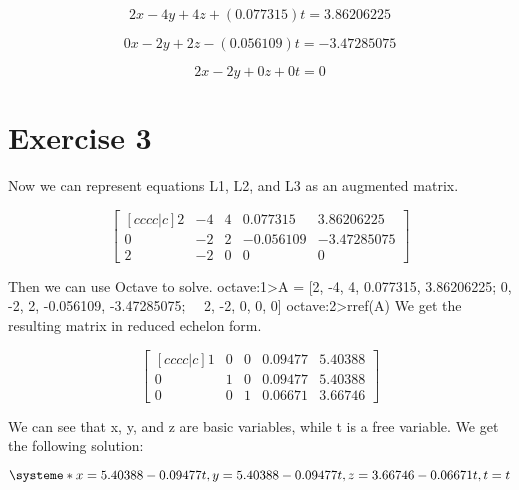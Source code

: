 \documentclass{article}
\begin{document}
\begin{equation}
    \label{equation 5}
    2x - 4y + 4z + (0.077315)t = 3.86206225   \tag{L1}
\end{equation}

\begin{equation}
    \label{equation 6}
    0x - 2y + 2z - (0.056109)t = -3.47285075  \tag{L2}
\end{equation}

\begin{equation}
    \label{equation 7}
    2x - 2y + 0z + 0t = 0 \tag{L3}
\end{equation}



\section*{Exercise 3}
Now we can represent equations L1, L2, and L3 as an augmented matrix.

$$ \begin{bmatrix}[cccc|c]
  2 & -4 & 4 & 0.077315 & 3.86206225\\
  0 & -2 & 2 & -0.056109 & -3.47285075\\
  2 & -2 & 0 & 0 & 0
\end{bmatrix} $$

\noindent Then we can use Octave to solve.
\newline \break
\textnormal{\indent \color{blue} octave:1\textgreater A = [2, -4, 4, 0.077315, 3.86206225; 0, -2, 2, -0.056109, -3.47285075; \indent \indent \indent \indent \indent \ \ 2, -2, 0, 0, 0]}
\newline
\textnormal{ \indent \color{blue} octave:2\textgreater rref(A) }
\newline \break
\textnormal{We get the resulting matrix in reduced echelon form.}

$$ \begin{bmatrix}[cccc|c]
  1 & 0 & 0 & 0.09477 & 5.40388\\
  0 & 1 & 0 & 0.09477 & 5.40388\\
  0 & 0 & 1 & 0.06671 & 3.66746
\end{bmatrix} $$


\noindent \textnormal{We can see that x, y, and z are basic variables, while t is a free variable.  
\newline \newline We get the following solution:}

\[
\systeme*{  x = 5.40388 - 0.09477t, 
            y = 5.40388 - 0.09477t, 
            z = 3.66746 - 0.06671t, 
            t = t}
\]
\end{document}
